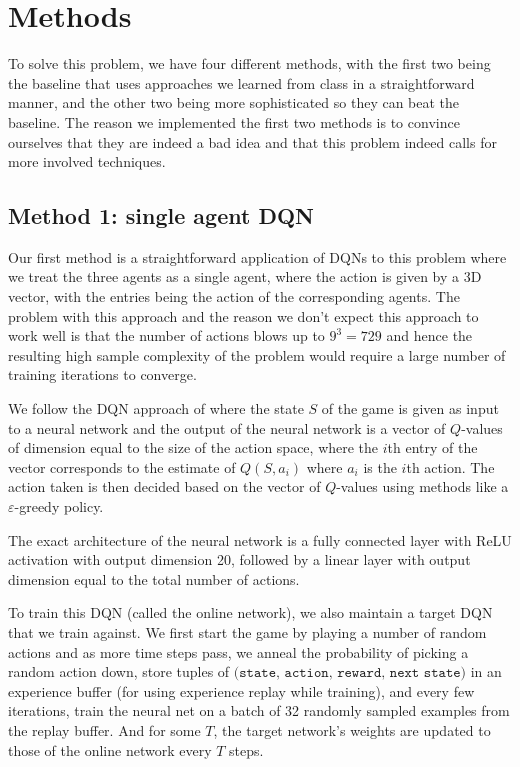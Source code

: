 \documentclass{article}
\begin{document}
\section{Methods}

To solve this problem, we have four different methods, with the
first two being the baseline that uses approaches we learned
from class in a straightforward manner, and the other two being
more sophisticated so they can beat the baseline. The
reason we implemented the first two methods is to
convince ourselves that they are indeed a bad idea and that
this problem indeed calls for more involved techniques.


\subsection{Method 1: single agent DQN}
Our first method is a straightforward application of
DQNs to this
problem where we treat the three agents as a single agent,
where the action is given by a 3D vector, with the
entries being the action of the corresponding agents.
The problem with this approach and the reason we don't expect
this approach to work well is that the number of actions blows
up to $9^3=729$ and hence the resulting high sample complexity
of the problem would require a large number of training
iterations to converge.

We follow the DQN approach of \cite{mnih2013playing}
where the state $S$ of the game is given as input to a
neural network and the output of the neural network
is a vector of $Q$-values of dimension equal to the
size of the action space, where the $i$th entry of the
vector corresponds to the estimate of $Q(S,a_i)$ where $a_i$
is the $i$th action. The action taken is then decided
based on the vector of $Q$-values using methods like
a $\varepsilon$-greedy policy.

The exact architecture of the neural network is
a fully connected layer with ReLU activation
with output dimension 20, followed by
a linear layer with output dimension
equal to the total number of actions.

To train this DQN (called the online network), we also maintain
a target DQN that we train against. We first start the game
by playing a number of random actions and as
more time steps pass, we anneal the
probability of picking a random action down,
store tuples of 
$\texttt{(state, action, reward, next state)}$
in an experience buffer (for using experience
replay while training), and every few iterations,
train the neural net on a batch of 32 randomly
sampled examples from the replay buffer. And
for some $T$, the target network's weights
are updated to those of the online network every
$T$ steps.
\end{document}
